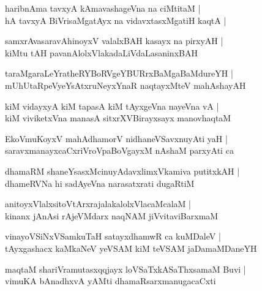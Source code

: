 \documentclass[twoside,12pt,openright]{book}
\newcounter{shloka}[chapter]
\begin{document}
\begin{shloka}%
haribnAma tavxyA kAmavashageVna na ciMtitaM |\\
hA tavxyA BiVrisaMgatAyx na vidavxtasxMgatiH kaqtA |\\
\end{shloka}

\begin{shloka}%
samxrAvasaravAhinoyxV valalxBAH kasayx na pirxyAH |\\
kiMtu tAH pavanAlolxVlakadaLiVdaLasaninxBAH
\end{shloka}

\begin{shloka}%
taraMgaraLeYratheRYBoRVgeYBURrxBaMgaBaMdureYH |\\
mUhUtaRpeVyeYsAtxruNeyxYnaR naqtayxMteV mahAshayAH 
\end{shloka}

\begin{shloka}%
kiM vidayxyA kiM tapasA kiM tAyxgeVna nayeVna vA |\\
kiM viviketxVna manasA sitxrXVBirayxsayx manovhaqtaM 
\end{shloka}

\begin{shloka}%
EkoVmuKoyxV mahAdhamorV nidhaneVSavxnuyAti yaH |\\
saravxmanayxcaCxriVroVpaBoVgayxM nAshaM parxyAti ca 
\end{shloka}

\begin{shloka}%
dhamaRM shaneYsasxMcinuyAdavxlimxVkamiva putitxkAH |\\
dhameRVNa hi sadAyeVna narasatxrati dugaRtiM 
\end{shloka}

\begin{shloka}%
anitoyxVlalxsitoVtArxrajalakalolxVlacaMcalaM |\\
kinanx jAnAsi rAjeVMdarx naqNAM jiVvitaviBarxmaM 
\end{shloka}

\begin{shloka}%
vinayoVSiNxVSamkuTaH satayxdhamwR ca kuMDaleV |\\
tAyxgashacx kaMkaNeV yeVSAM kiM teVSAM jaDamaMDaneYH 
\end{shloka}

\begin{shloka}%
maqtaM shariVramutasxqqjayx loVSaTxkASaThxsamaM Buvi |\\
vimuKA bAnadhxvA yAMti dhamaRsarxmanugacaCxti 
\end{shloka}
\end{document}
